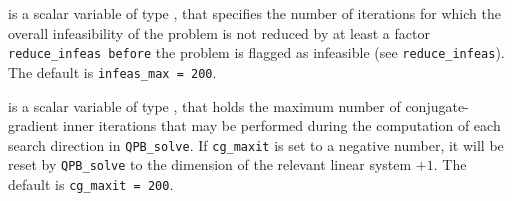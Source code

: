 \begin{description}




 is a scalar variable of type \integer, that specifies
the number of iterations for which the overall infeasibility
of the problem is not reduced by at least a factor {\tt reduce\_infeas
before} the problem is flagged as infeasible (see {\tt reduce\_infeas}).
The default is {\tt infeas\_max = 200}.

 is a scalar variable of type \integer, that holds the
maximum number of conjugate-gradient inner iterations that may be performed
during the computation of each search direction in {\tt QPB\_solve}.
If {\tt cg\_maxit} is set to a negative number, it will be reset by 
{\tt QPB\_solve} to the dimension of the relevant linear system $+ 1$.
The default is {\tt cg\_maxit = 200}.




\end{description}

